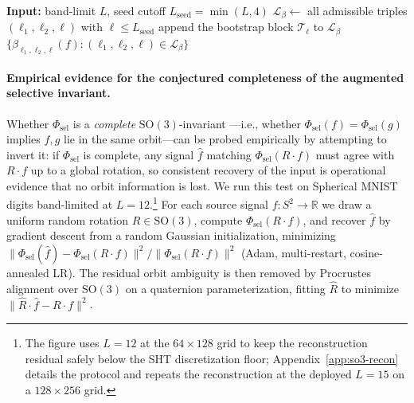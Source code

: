 \documentclass{article}
\theoremstyle{definition}
\theoremstyle{remark}
\newcommand{\R}{\mathbb{R}}
\newcommand{\SO}{\mathrm{SO}}
\theoremstyle{definition}
\begin{document}
\begin{algorithm}[H]
\caption{Bispectral triples in the Mataigne-style BFS chain
  (mirrors~\citet{mataigne2024selective}, Alg.~1): seed block at low
  degrees plus per-degree bootstrap blocks. The full index set of
  $\Phi_{\mathrm{sel}}$, including even self-couplings
  $\beta_{\ell,\ell,\ell'}$ and CG-power scalars
  $P_{\ell_1,\ell_2,\ell}$, is built by
  Algorithm~\ref{alg:so3-augmented} in
  Appendix~\ref{sec:app-selective-index}.}
\label{alg:selective-bsp-so3}
\small
\begin{algorithmic}[1]
\STATE \textbf{Input:} band-limit $L$,
  seed cutoff $L_{\mathrm{seed}} = \min(L,4)$
\STATE $\mathcal{L}_\beta \leftarrow$ all admissible triples
  $(\ell_1,\ell_2,\ell)$ with $\ell\le L_{\mathrm{seed}}$
  \STATE append the bootstrap block $\mathcal{T}_\ell$
    to $\mathcal{L}_\beta$
\ENDFOR
\RETURN $\{\beta_{\ell_1,\ell_2,\ell}(f) :
  (\ell_1,\ell_2,\ell)\in\mathcal{L}_\beta\}$
\end{algorithmic}
\end{algorithm}


\paragraph{Empirical evidence for the conjectured completeness of the
augmented selective invariant.}
\label{sec:so3-recon}
Whether $\Phi_{\mathrm{sel}}$ is a \emph{complete} $\SO(3)$-invariant
---i.e., whether $\Phi_{\mathrm{sel}}(f) = \Phi_{\mathrm{sel}}(g)$
implies $f, g$ lie in the same orbit---can be probed empirically by
attempting to invert it: if $\Phi_{\mathrm{sel}}$ is complete, any
signal $\hat f$ matching $\Phi_{\mathrm{sel}}(R\cdot f)$ must agree
with $R\cdot f$ up to a global rotation, so consistent recovery of
the input is operational evidence that no orbit information is lost.
We run this test on Spherical MNIST digits band-limited at
$L = 12$.\footnote{The figure uses $L{=}12$ at the $64{\times}128$
grid to keep the reconstruction residual safely below the SHT
discretization floor; Appendix~\ref{app:so3-recon} details the
protocol and repeats the reconstruction at the deployed $L{=}15$ on a
$128{\times}256$ grid.} For each source signal
$f:S^2\to\R$ we draw a uniform random rotation $R\in\SO(3)$, compute
$\Phi_{\mathrm{sel}}(R\cdot f)$, and recover $\hat f$ by gradient
descent from a random Gaussian initialization, minimizing
$\lVert \Phi_{\mathrm{sel}}(\hat f) -
\Phi_{\mathrm{sel}}(R\cdot f)\rVert^2 / \lVert
\Phi_{\mathrm{sel}}(R\cdot f)\rVert^2$ (Adam, multi-restart,
cosine-annealed LR). The residual orbit ambiguity is then removed by
Procrustes alignment over $\SO(3)$ on a quaternion parameterization,
fitting $\hat R$ to minimize $\lVert \hat R\cdot\hat f -
R\cdot f\rVert^2$.
\end{document}
